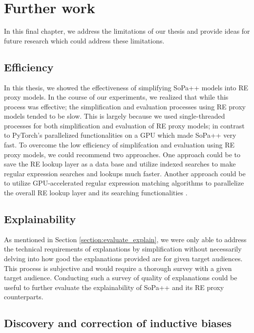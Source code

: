 \chapter{Further work}

\label{chapter:further_work}

In this final chapter, we address the limitations of our thesis and provide
ideas for future research which could address these limitations.

\section{Efficiency}

In this thesis, we showed the effectiveness of simplifying SoPa++ models into RE
proxy models. In the course of our experiments, we realized that while this
process was effective; the simplification and evaluation processes using RE
proxy models tended to be slow. This is largely because we used single-threaded
processes for both simplification and evaluation of RE proxy models; in contrast
to PyTorch's parallelized functionalities on a GPU which made SoPa++ very fast.
To overcome the low efficiency of simplifcation and evaluation using RE proxy
models, we could recommend two approaches. One approach could be to save the RE
lookup layer as a data base and utilize indexed searches to make regular
expression searches and lookups much faster. Another approach could be to
utilize GPU-accelerated regular expression matching algorithms to parallelize
the overall RE lookup layer and its searching functionalities
\citep{wang2011gregex,zu2012gpu,yu2013gpu}.

\section{Explainability}

As mentioned in Section \ref{section:evaluate_explain}, we were only able to
address the technical requirements of explanations by simplification without
necessarily delving into how good the explanations provided are for given target
audiences. This process is subjective and would require a thorough survey with a
given target audience. Conducting such a survey of quality of explanations could
be useful to further evaluate the explainability of SoPa++ and its RE proxy
counterparts.

\section{Discovery and correction of inductive biases}

